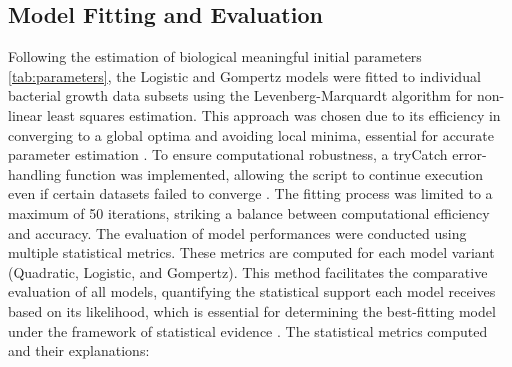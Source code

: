 \documentclass[11pt]{article}
\begin{document}
\subsection*{Model Fitting and Evaluation}
Following the estimation of biological meaningful initial parameters  \autoref{tab:parameters}, the Logistic and Gompertz models were fitted to individual bacterial growth data subsets using the Levenberg-Marquardt algorithm for non-linear least squares estimation. This approach was chosen due to its efficiency in converging to a global optima and avoiding local minima, essential for accurate parameter estimation \parencite{bergou2020}. To ensure computational robustness, a tryCatch error-handling function was implemented, allowing the script to continue execution even if certain datasets failed to converge \parencite{wickham2014advanced}. The fitting process was limited to a maximum of 50 iterations, striking a balance between computational efficiency and accuracy. The evaluation of model performances were conducted using multiple statistical metrics. These metrics are computed for each model variant (Quadratic, Logistic, and Gompertz). This method facilitates the comparative evaluation of all models, quantifying the statistical support each model receives based on its likelihood, which is essential for determining the best-fitting model under the framework of statistical evidence \parencite[]{royall1997statistical}. 
\newpage
The statistical metrics computed and their explanations:
\end{document}
